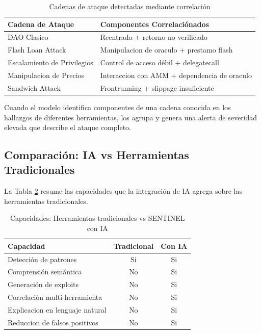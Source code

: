 \documentclass[12pt,a4paper,twoside]{book}
\begin{document}
\begin{table}[h]
\centering
\caption{Cadenas de ataque detectadas mediante correlación}
\label{tab:cadenas_ataque}
\begin{tabular}{p{3.5cm}p{9cm}}
\toprule
\textbf{Cadena de Ataque} & \textbf{Componentes Correlaciónados} \\
\midrule
DAO Clasico & Reentrada + retorno no verificado \\
Flash Loan Attack & Manipulacion de oraculo + prestamo flash \\
Escalamiento de Privilegios & Control de acceso débil + delegatecall \\
Manipulacion de Precios & Interaccion con AMM + dependencia de oraculo \\
Sandwich Attack & Frontrunning + slippage insuficiente \\
\bottomrule
\end{tabular}
\end{table}

Cuando el modelo identifica componentes de una cadena conocida en los hallazgos de diferentes herramientas, los agrupa y genera una alerta de severidad elevada que describe el ataque completo.

\subsection{Comparación: IA vs Herramientas Tradicionales}

La Tabla \ref{tab:ia_vs_tradicional} resume las capacidades que la integración de IA agrega sobre las herramientas tradicionales.

\begin{table}[h]
\centering
\caption{Capacidades: Herramientas tradicionales vs SENTINEL con IA}
\label{tab:ia_vs_tradicional}
\begin{tabular}{lcc}
\toprule
\textbf{Capacidad} & \textbf{Tradicional} & \textbf{Con IA} \\
\midrule
Detección de patrones & Si & Si \\
Comprensión semántica & No & Si \\
Generación de exploits & No & Si \\
Correlación multi-herramienta & No & Si \\
Explicacion en lenguaje natural & No & Si \\
Reduccion de falsos positivos & No & Si \\
\bottomrule
\end{tabular}
\end{table}
\end{document}
